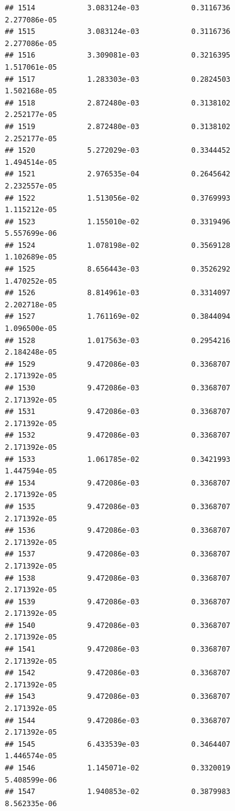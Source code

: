 \documentclass[
]{article}
\begin{document}
\begin{verbatim}
## 1514            3.083124e-03            0.3116736            2.277086e-05
## 1515            3.083124e-03            0.3116736            2.277086e-05
## 1516            3.309081e-03            0.3216395            1.517061e-05
## 1517            1.283303e-03            0.2824503            1.502168e-05
## 1518            2.872480e-03            0.3138102            2.252177e-05
## 1519            2.872480e-03            0.3138102            2.252177e-05
## 1520            5.272029e-03            0.3344452            1.494514e-05
## 1521            2.976535e-04            0.2645642            2.232557e-05
## 1522            1.513056e-02            0.3769993            1.115212e-05
## 1523            1.155010e-02            0.3319496            5.557699e-06
## 1524            1.078198e-02            0.3569128            1.102689e-05
## 1525            8.656443e-03            0.3526292            1.470252e-05
## 1526            8.814961e-03            0.3314097            2.202718e-05
## 1527            1.761169e-02            0.3844094            1.096500e-05
## 1528            1.017563e-03            0.2954216            2.184248e-05
## 1529            9.472086e-03            0.3368707            2.171392e-05
## 1530            9.472086e-03            0.3368707            2.171392e-05
## 1531            9.472086e-03            0.3368707            2.171392e-05
## 1532            9.472086e-03            0.3368707            2.171392e-05
## 1533            1.061785e-02            0.3421993            1.447594e-05
## 1534            9.472086e-03            0.3368707            2.171392e-05
## 1535            9.472086e-03            0.3368707            2.171392e-05
## 1536            9.472086e-03            0.3368707            2.171392e-05
## 1537            9.472086e-03            0.3368707            2.171392e-05
## 1538            9.472086e-03            0.3368707            2.171392e-05
## 1539            9.472086e-03            0.3368707            2.171392e-05
## 1540            9.472086e-03            0.3368707            2.171392e-05
## 1541            9.472086e-03            0.3368707            2.171392e-05
## 1542            9.472086e-03            0.3368707            2.171392e-05
## 1543            9.472086e-03            0.3368707            2.171392e-05
## 1544            9.472086e-03            0.3368707            2.171392e-05
## 1545            6.433539e-03            0.3464407            1.446574e-05
## 1546            1.145071e-02            0.3320019            5.408599e-06
## 1547            1.940853e-02            0.3879983            8.562335e-06

\end{verbatim}
\end{document}
